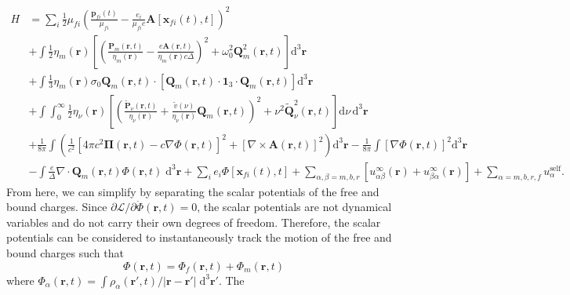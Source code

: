 \documentclass{article}
\begin{document}
\begin{equation}
\begin{split}
H &= \sum_i\frac{1}{2}\mu_{fi}\left(\frac{\mathbf{p}_{fi}(t)}{\mu_{fi}} - \frac{e_i}{\mu_{fi}c}\mathbf{A}\left[\mathbf{x}_{fi}(t),t\right]\right)^2\\
&+ \int\frac{1}{2}\eta_m(\mathbf{r})\left[\left(\frac{\mathbf{P}_m(\mathbf{r},t)}{\eta_m(\mathbf{r})} - \frac{e\mathbf{A}(\mathbf{r},t)}{\eta_m(\mathbf{r})c\Delta}\right)^2 + \omega_0^2\mathbf{Q}_m^2(\mathbf{r},t)\right]\mathrm{d}^3\mathbf{r}\\
&+ \int\frac{1}{3}\eta_m(\mathbf{r})\sigma_0 \mathbf{Q}_m(\mathbf{r},t)\cdot\left[\mathbf{Q}_m(\mathbf{r},t)\cdot\bm{1}_3\cdot\mathbf{Q}_m(\mathbf{r},t)\right]\mathrm{d}^3\mathbf{r}\\
&+ \int\int_0^\infty\frac{1}{2}\eta_\nu(\mathbf{r})\left[\left(\frac{\tilde{\mathbf{P}}_\nu(\mathbf{r},t)}{\eta_\nu(\mathbf{r})} + \frac{\tilde{v}(\nu)}{\eta_\nu(\mathbf{r})}\mathbf{Q}_m(\mathbf{r},t)\right)^2 + \nu^2\tilde{\mathbf{Q}}_\nu^2(\mathbf{r},t)\right]\mathrm{d}\nu\,\mathrm{d}^3\mathbf{r}\\
&+ \frac{1}{8\pi}\int\left(\frac{1}{c^2}\left[4\pi c^2\bm{\Pi}(\mathbf{r},t) - c\nabla\Phi(\mathbf{r},t)\right]^2 + \left[\nabla\times\mathbf{A}(\mathbf{r},t)\right]^2\right)\mathrm{d}^3\mathbf{r} - \frac{1}{8\pi}\int\left[\nabla\Phi(\mathbf{r},t)\right]^2\mathrm{d}^3\mathbf{r}\\
&- \int\frac{e}{\Delta}\nabla\cdot\mathbf{Q}_m(\mathbf{r},t)\Phi(\mathbf{r},t)\;\mathrm{d}^3\mathbf{r} + \sum_ie_i\Phi[\mathbf{x}_{fi}(t),t] + \sum_{\alpha,\beta = m,b,r}\left[u_{\alpha\beta}^\infty(\mathbf{r}) + u_{\beta\alpha}^\infty(\mathbf{r})\right] + \sum_{\alpha = m,b,r,f}u_\alpha^\mathrm{self}.
\end{split}
\end{equation}
From here, we can simplify by separating the scalar potentials of the free and bound charges. Since $\partial\mathcal{L}/\partial\dot{\Phi}(\mathbf{r},t) = 0$, the scalar potentials are not dynamical variables and do not carry their own degrees of freedom. Therefore, the scalar potentials can be considered to instantaneously track the motion of the free and bound charges such that
\begin{equation}
\Phi(\mathbf{r},t) = \Phi_f(\mathbf{r},t) + \Phi_m(\mathbf{r},t)
\end{equation}
where $\Phi_\alpha(\mathbf{r},t) = \int\rho_\alpha(\mathbf{r}',t)/|\mathbf{r} - \mathbf{r}'|\;\mathrm{d}^3\mathbf{r}'$. The 
\end{document}
